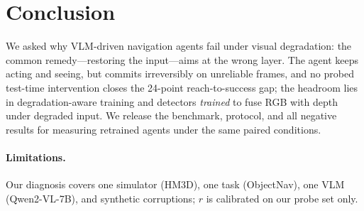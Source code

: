 \section{Conclusion}

We asked why VLM-driven navigation agents fail under visual degradation:
the common remedy---restoring the input---aims at the wrong layer. The
agent keeps acting and seeing, but commits irreversibly on unreliable
frames, and no probed test-time intervention closes the 24-point
reach-to-success gap; the headroom lies in degradation-aware training
and detectors \emph{trained} to fuse RGB with depth under degraded
input. We release the benchmark, protocol, and all negative results for
measuring retrained agents under the same paired conditions.

\paragraph{Limitations.}
Our diagnosis covers one simulator (HM3D), one task (ObjectNav), one VLM
(Qwen2-VL-7B), and synthetic corruptions; $r$ is calibrated on our probe
set only.
